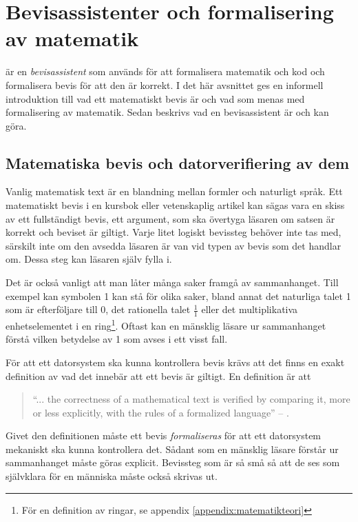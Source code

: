 \section{Bevisassistenter och formalisering av matematik}
\coq är en \emph{bevisassistent} som används för att formalisera matematik och
kod och formalisera bevis för att den är korrekt. I det här avsnittet ges en
informell introduktion till vad ett matematiskt bevis är och vad som menas med
formalisering av matematik. Sedan beskrivs vad en bevisassistent är och kan
göra.

\subsection{Matematiska bevis och datorverifiering av dem}
Vanlig matematisk text är en blandning mellan formler och naturligt språk. Ett
matematiskt bevis i en kursbok eller vetenskaplig artikel kan sägas vara en
skiss av ett fullständigt bevis, ett argument, som ska övertyga läsaren om
satsen är korrekt och beviset är giltigt. Varje litet logiskt bevissteg behöver
inte tas med, särskilt inte om den avsedda läsaren är van vid typen av bevis
som det handlar om. Dessa steg kan läsaren själv fylla i.


Det är också vanligt att man låter många saker framgå av sammanhanget. Till
exempel kan symbolen 1 kan stå för olika saker, bland annat det naturliga talet
1 som är efterföljare till 0, det rationella talet $\frac{1}{1}$ eller det
multiplikativa enhetselementet i en ring\footnote{För en definition av ringar,
se appendix \ref{appendix:matematikteori}}. Oftast kan en mänsklig läsare ur
sammanhanget förstå vilken betydelse av 1 som avses i ett visst fall.

För att ett datorsystem ska kunna kontrollera bevis krävs att det finns en
exakt definition av vad det innebär att ett bevis är giltigt. En definition är
att
\begin{quote}
``... the correctness of a mathematical text is verified by comparing it, more or
less explicitly, with the rules of a formalized language'' -- \cite{bourbaki1968sets}.
\end{quote}

Givet den definitionen måste ett bevis \emph{formaliseras} för att ett
datorsystem mekaniskt ska kunna kontrollera det. Sådant som en mänsklig läsare
förstår ur sammanhanget måste göras explicit. Bevissteg som är så små så att de
ses som självklara för en människa måste också skrivas ut.

